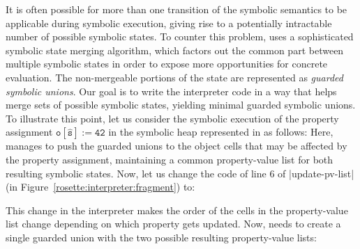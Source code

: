 It is often possible for more than one transition of the symbolic 
semantics to be applicable during symbolic execution, 
giving rise to a potentially intractable number of possible symbolic states. 
To counter this problem, \rosette uses a sophisticated 
symbolic state merging algorithm, which factors out the common 
part between multiple symbolic states  in order to expose more 
opportunities for concrete evaluation. The non-mergeable portions of the state 
are represented as \emph{guarded symbolic unions}. 
Our goal is to write the interpreter code in a way that helps 
\rosette merge sets of possible symbolic states, yielding minimal 
guarded symbolic unions.
To illustrate this point, let us consider the symbolic execution 
of the property assignment $\mathtt{o[\hat{s}] := 42}$ in the 
symbolic heap represented in \rosette as follows: 
%
%
%
%
\smallskip
\noindent
Here, \rosette manages to push the guarded unions to 
the object cells that may be affected by the property assignment, maintaining a common 
property-value list for both resulting symbolic states. 
Now, let us change the code of line 6 of \schemeinline|update-pv-list| 
(in Figure~\ref{rosette:interpreter:fragment}) to:  


\smallskip
\noindent
This change in the interpreter makes the order of the cells in the property-value 
list change depending on which property gets updated. 
Now, \rosette needs to create a single guarded union 
with the two possible resulting property-value lists: 


